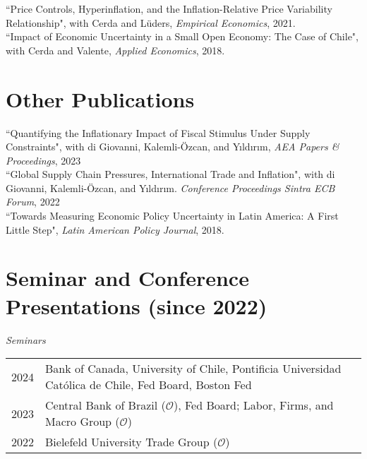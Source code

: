 \documentclass[10pt]{article}
\begin{document}
\noindent ``Price Controls, Hyperinflation, and the Inflation-Relative Price Variability Relationship", with Cerda and L\"{u}ders, \emph{Empirical Economics}, 2021.\\[-0.125in]
   
 \noindent ``Impact of Economic Uncertainty in a Small Open Economy: The Case of Chile", with Cerda and Valente, \emph{Applied Economics}, 2018.

\section*{Other Publications}
   
\noindent ``Quantifying the Inflationary Impact of Fiscal Stimulus Under Supply Constraints", with di Giovanni, Kalemli-\"{O}zcan, and Y{\i}ld{\i}r{\i}m, \emph{AEA Papers \& Proceedings}, 2023\\[-0.125in]
   
\noindent ``Global Supply Chain Pressures, International Trade and Inflation", with di Giovanni, Kalemli-\"{O}zcan, and Y{\i}ld{\i}r{\i}m. {\emph{Conference Proceedings Sintra ECB Forum}, 2022}\\[-0.125in]
   
 \noindent ``Towards Measuring Economic Policy Uncertainty in Latin America: A First Little Step", \emph{Latin American Policy Journal}, 2018. \\[-0.125in]


\section*{Seminar and Conference Presentations (since 2022)}

\noindent 
\emph{Seminars}\\[0.1in]
\begin{tabular}{@{}p{1.8cm}p{13cm}}
2024& Bank of Canada, University of Chile, Pontificia Universidad Cat\'olica de Chile, Fed Board, Boston Fed\\
2023& Central Bank of Brazil ($\mathcal{O}$), Fed Board; Labor, Firms, and Macro Group ($\mathcal{O}$)\\
2022& Bielefeld University Trade Group ($\mathcal{O}$)%
\end{tabular}
\end{document}
